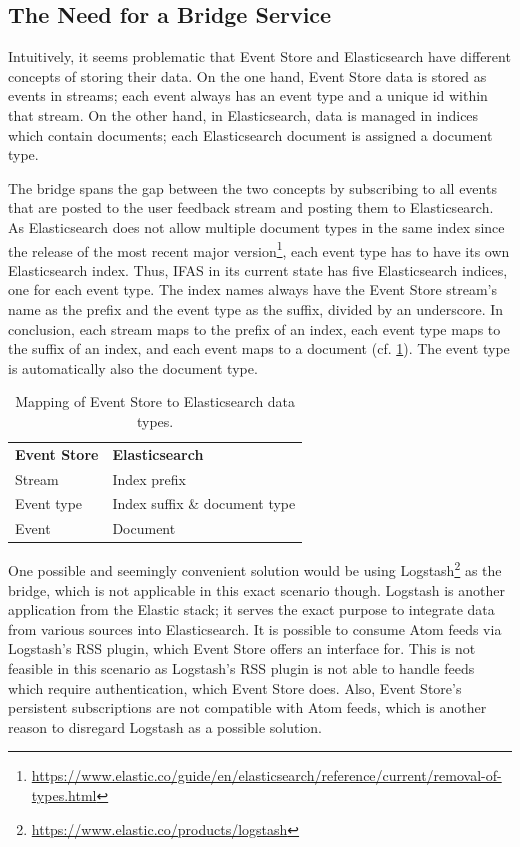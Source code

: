 \subsection{The Need for a Bridge Service}

Intuitively, it seems problematic that Event Store and Elasticsearch have different concepts of storing their data.
On the one hand, Event Store data is stored as events in streams; each event always has an event type and a unique id within that stream.
On the other hand, in Elasticsearch, data is managed in indices which contain documents; each Elasticsearch document is assigned a document type.

The bridge spans the gap between the two concepts by subscribing to all events that are posted to the user feedback stream and posting them to Elasticsearch.
As Elasticsearch does not allow multiple document types in the same index since the release of the most recent major version\footnote{\url{https://www.elastic.co/guide/en/elasticsearch/reference/current/removal-of-types.html}}, each event type has to have its own Elasticsearch index.
Thus, \ac{IFAS} in its current state has five Elasticsearch indices, one for each event type.
The index names always have the Event Store stream's name as the prefix and the event type as the suffix, divided by an underscore.
In conclusion, each stream maps to the prefix of an index, each event type maps to the suffix of an index, and each event maps to a document (cf. \cref{table:design:bridge}).
The event type is automatically also the document type.


\begin{table}[ht]
\centering
\caption{Mapping of Event Store to Elasticsearch data types.}
\label{table:design:bridge}
\begin{tabular}{l|l}
\textbf{Event Store} & \textbf{Elasticsearch} \\ \cline{1-2}
Stream & Index prefix \\
Event type & Index suffix \& document type \\
Event & Document
\end{tabular}
\end{table}

One possible and seemingly convenient solution would be using Logstash\footnote{\url{https://www.elastic.co/products/logstash}} as the bridge, which is not applicable in this exact scenario though.
Logstash is another application from the Elastic stack; it serves the exact purpose to integrate data from various sources into Elasticsearch.
It is possible to consume Atom feeds via Logstash's \ac{RSS} plugin, which Event Store offers an interface for.
This is not feasible in this scenario as Logstash's \ac{RSS} plugin is not able to handle feeds which require authentication, which Event Store does.
Also, Event Store's persistent subscriptions are not compatible with Atom feeds, which is another reason to disregard Logstash as a possible solution.

